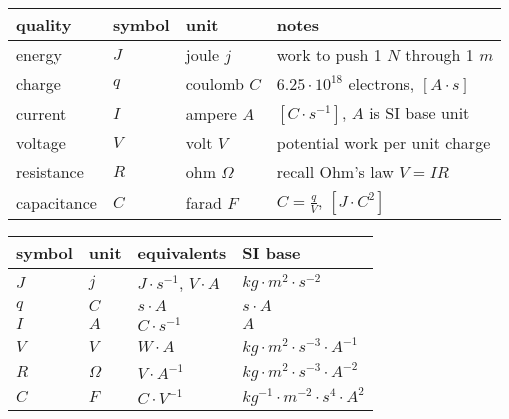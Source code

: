 \begin{table*}[htp!]
    \begin{center}

    \begin{tabular}{llll}
        \hline
        quality & symbol & unit  & notes \\
        \hline
        energy     & $J$ & joule   $j$  & work to push 1 $N$ through 1 $m$ \\
        charge     & $q$ & coulomb $C$  & $6.25\cdot10^{18}$ electrons, $[A\cdot s]$ \\
        current    & $I$ & ampere  $A$  & $[C\cdot s^{-1}]$, $A$ is SI base unit\\
        voltage    & $V$ & volt    $V$  & potential work per unit charge \\
        resistance & $R$ & ohm $\Omega$ & recall Ohm's law $V=IR$ \\
        capacitance& $C$ & farad   $F$  & $C=\frac{q}{V}$, $[J\cdot C^{2}]$\\
        \hline
    \end{tabular}

    \begin{tabular}{llll}
        \hline
        symbol & unit & equivalents & SI base \\
        \hline
        $J$    & $j$      &  $J\cdot s^{-1}$, $V\cdot A$ &
            $kg\cdot m^{2}\cdot s^{-2}$ \\

        $q$    & $C$      & $s\cdot A$ &
            $s\cdot A$ \\

        $I$    & $A$  & $C\cdot s^{-1}$ &
            $A$ \\

        $V$    & $V$      & $W\cdot A$ &
            $kg\cdot m^{2}\cdot s^{-3}\cdot A^{-1}$ \\

        $R$    & $\Omega$ & $V\cdot A^{-1}$ &
            $kg\cdot m^{2}\cdot s^{-3}\cdot A^{-2}$ \\

        $C$    & $F$      & $C\cdot V^{-1}$  &
            $kg^{-1}\cdot m^{-2}\cdot s^{4}\cdot A^{2}$ \\
        \hline
    \end{tabular}

    \end{center}
    \caption{Symbols and quantities.}
\end{table*}
